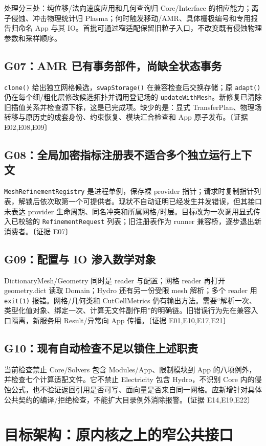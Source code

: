 \documentclass[UTF8,a4paper,11pt,fontset=fandol]{ctexart}
\newcommand{\code}[1]{\nolinkurl{#1}}
\newcommand{\ev}[1]{{\small\color{muted}〔证据 #1〕}}
\begin{document}
处理分三处：纯位移/法向速度应用和几何查询归 Core/Interface 的相应能力；离子侵蚀、冲击物理统计归 Plasma；何时触发移动/AMR、具体栅极编号和专用报告归命名 App 与其 IO。首批可通过窄适配保留旧粒子入口，不改变既有侵蚀物理参数和采样顺序。

\subsection{G07：AMR 已有事务部件，尚缺全状态事务}
\code{clone()} 给出独立网格候选，\code{swapStorage()} 在兼容检查后交换存储；原 \code{adapt()} 仍在每个细/粗化层修改候选拓扑并调用登记场的 \code{updateWithMesh}。新修复已清除旧插值关系并检查源下标，这是已完成项。缺少的是：显式 TransferPlan、物理场转移与原历史的成套身份、约束恢复、模块汇合检查和 App 原子发布。\ev{E02,E08,E09}

\subsection{G08：全局加密指标注册表不适合多个独立运行上下文}
\code{MeshRefinementRegistry} 是进程单例，保存裸 provider 指针；请求时复制指针列表，解锁后依次取第一个可提供者。现状不自动证明已经发生并发错误，但其接口未表达 provider 生命周期、同名冲突和所属网格/时层。目标改为一次调用显式传入已校验的 \code{RefinementRequest} 列表；旧注册表作为 runner 兼容桥，逐步退出新消费者。\ev{E07}

\subsection{G09：配置与 IO 渗入数学对象}
DictionaryMesh/Geometry 同时是 reader 与配置；网格 reader 再打开 geometry.dict 读取 Domain；Hydro 还有另一份受限 mesh 解析；多个 reader 用 \code{exit(1)} 报错。网格/几何类和 CutCellMetrics 仍有输出方法。需要“解析一次、类型化值对象、绑定一次、计算无文件副作用”的明确链。旧错误行为先在兼容入口隔离，新服务用 Result/异常向 App 传播。\ev{E01,E10,E17,E21}

\subsection{G10：现有自动检查不足以锁住上述职责}
当前检查禁止 Core/Solvers 包含 Modules/App、限制模块到 App 的八项例外，并检查七个计算适配文件。它不禁止 Electricity 包含 Hydro，不识别 Core 内的侵蚀公式，也不验证返回引用是否可写、面向量是否来自同一网格。应新增针对具体公共契约的编译/拒绝检查，不能扩大目录例外消除报警。\ev{E14,E19,E22}

\Needspace{110mm}
\section{目标架构：原内核之上的窄公共接口}
\end{document}
